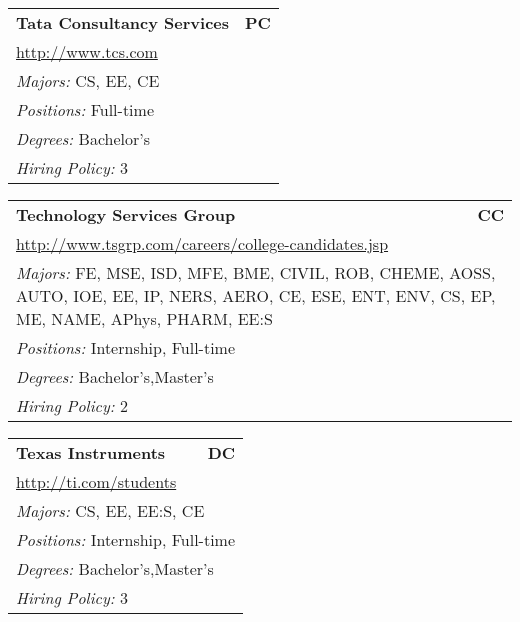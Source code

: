 \documentclass[twoside]{article}
\begin{document}
\begin{center}
\begin{multicols}{3}
\begin{FlushLeft}
\begin{minipage}{\columnwidth}\begin{tabularx}{.95\columnwidth}{Xr}
                 {\Large\bf Tata Consultancy Services} & {\Large\bf PC}\\
    \multicolumn{2}{p{.95\columnwidth}}{\url{http://www.tcs.com}}\\
    \multicolumn{2}{p{.95\columnwidth}}{\emph{Majors:} CS, EE, CE}\\
    \multicolumn{2}{p{.95\columnwidth}}{\emph{Positions:} Full-time}\\
    \multicolumn{2}{p{.95\columnwidth}}{\emph{Degrees:} Bachelor's}\\
    \multicolumn{2}{p{.95\columnwidth}}{\emph{Hiring Policy:} 3}\\
    \end{tabularx}
    
\end{minipage}
 
\begin{minipage}{\columnwidth}\begin{tabularx}{.95\columnwidth}{Xr}
                 {\Large\bf Technology Services Group} & {\Large\bf CC}\\
    \multicolumn{2}{p{.95\columnwidth}}{\url{http://www.tsgrp.com/careers/college-candidates.jsp}}\\
    \multicolumn{2}{p{.95\columnwidth}}{\emph{Majors:} FE, MSE, ISD, MFE, BME, CIVIL, ROB, CHEME, AOSS, AUTO, IOE, EE, IP, NERS, AERO, CE, ESE, ENT, ENV, CS, EP, ME, NAME, APhys, PHARM, EE:S}\\
    \multicolumn{2}{p{.95\columnwidth}}{\emph{Positions:} Internship, Full-time}\\
    \multicolumn{2}{p{.95\columnwidth}}{\emph{Degrees:} Bachelor's,Master's}\\
    \multicolumn{2}{p{.95\columnwidth}}{\emph{Hiring Policy:} 2}\\
    \end{tabularx}
    
\end{minipage}
 
\begin{minipage}{\columnwidth}\begin{tabularx}{.95\columnwidth}{Xr}
                 {\Large\bf Texas Instruments} & {\Large\bf DC}\\
    \multicolumn{2}{p{.95\columnwidth}}{\url{http://ti.com/students}}\\
    \multicolumn{2}{p{.95\columnwidth}}{\emph{Majors:} CS, EE, EE:S, CE}\\
    \multicolumn{2}{p{.95\columnwidth}}{\emph{Positions:} Internship, Full-time}\\
    \multicolumn{2}{p{.95\columnwidth}}{\emph{Degrees:} Bachelor's,Master's}\\
    \multicolumn{2}{p{.95\columnwidth}}{\emph{Hiring Policy:} 3}\\
    \end{tabularx}
    

\end{minipage}
\end{FlushLeft}
\end{multicols}
\end{center}
\end{document}
